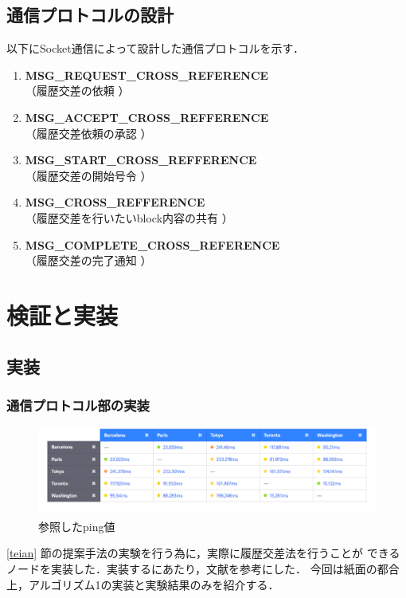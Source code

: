 \documentclass[a4paper,12pt]{jsarticle}
\begin{document}
\subsection{通信プロトコルの設計}

以下にSocket通信によって設計した通信プロトコルを示す．

\hspace{5mm}
%
\begin{enumerate}
\item \textbf{MSG\_REQUEST\_CROSS\_REFERENCE}\\
\hspace{12mm} （履歴交差の依頼 ）
\item \textbf{MSG\_ACCEPT\_CROSS\_REFFERENCE}\\
\hspace{12mm}  （履歴交差依頼の承認 ）
  \item \textbf{MSG\_START\_CROSS\_REFFERENCE}\\
\hspace{12mm}  （履歴交差の開始号令 ）
  \item \textbf{MSG\_CROSS\_REFFERENCE}\\
\hspace{12mm}  （履歴交差を行いたいblock内容の共有 ）
  \item \textbf{MSG\_COMPLETE\_CROSS\_REFERENCE}\\
\hspace{12mm}  （履歴交差の完了通知 ）
\end{enumerate}
%
\hspace{5mm}

\section{検証と実装}
\subsection{実装}
\subsubsection{通信プロトコル部の実装}
\label{syuhou}

%
\begin{figure}[H]%
  \begin{center}
    \includegraphics[width=160mm]{pht/Screenshot.eps}
  \end{center}
	\caption{参照したping値\cite{pings}}
  \label{fig:pings}
\end{figure}
%
\ref{teian} 節の提案手法の実験を行う為に，実際に履歴交差法を行うことが
できるノードを実装した．実装するにあたり，文献\cite{hamatsu2018}を参考にした．
今回は紙面の都合上，アルゴリズム1の実装と実験結果のみを紹介する．
\end{document}
